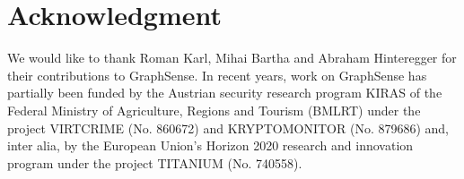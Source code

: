 
\section{Acknowledgment}

We would like to thank Roman Karl, Mihai Bartha and Abraham Hinteregger for their contributions to GraphSense. In recent years, work on GraphSense has partially been funded by the Austrian security research program KIRAS of the Federal Ministry of
Agriculture, Regions and Tourism (BMLRT) under the project VIRTCRIME (No. 860672) and KRYPTOMONITOR (No. 879686) and, inter alia, by the European Union’s Horizon 2020 research and innovation program under the project TITANIUM (No. 740558).